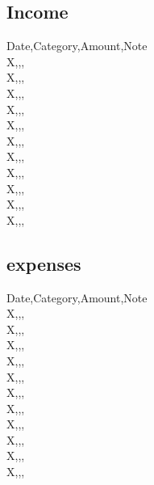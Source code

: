 \documentclass[a4paper]{article}
\begin{document}
\subsection{Income}
Date,Category,Amount,Note\\
X,,,\\
X,,,\\
X,,,\\
X,,,\\
X,,,\\
X,,,\\
X,,,\\
X,,,\\
X,,,\\
X,,,\\
X,,,\\
\subsection{expenses}
Date,Category,Amount,Note\\
X,,,\\
X,,,\\
X,,,\\
X,,,\\
X,,,\\
X,,,\\
X,,,\\
X,,,\\
X,,,\\
X,,,\\
X,,,\\
\end{document}
